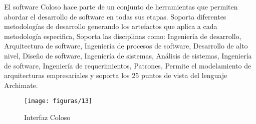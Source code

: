 El software Coloso hace parte de un conjunto de herramientas que permiten abordar el desarrollo de software en todas sus etapas. Soporta diferentes metodologías de desarrollo generando los artefactos que aplica a cada metodología especifica, Soporta las disciplinas como: Ingeniería de desarrollo, Arquitectura de software, Ingeniería de procesos de software, Desarrollo de alto nivel, Diseño de software, Ingeniería de sistemas, Análisis de sistemas, Ingeniería de software, Ingeniería de requerimientos, Patrones, Permite el modelamiento de arquitecturas empresariales y soporta los 25 puntos de vista del lenguaje Archimate.
  \begin{figure}[H]
   	\centering
   	\texttt{[image: figuras/13]}
   	\captionsetup{width=.95\textwidth}
   	\caption{Interfaz Coloso}
   	\label{figura13}
  \end{figure}
